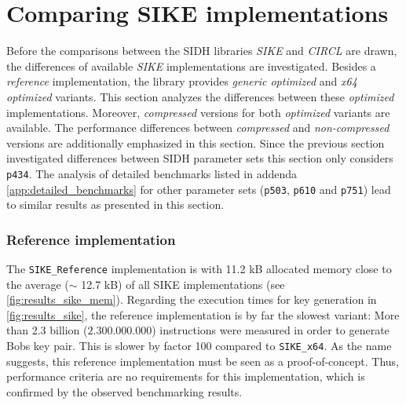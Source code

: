\section{Comparing \gls{SIKE} implementations}\label{sec:analysis_sike}
Before the comparisons between the \gls{SIDH} libraries \textit{\gls{SIKE}} and \textit{\gls{CIRCL}} are drawn, the differences of available \textit{\gls{SIKE}} implementations are investigated. Besides a \textit{reference} implementation, the library provides \textit{generic optimized} and \textit{x64 optimized} variants. This section analyzes the differences between these \textit{optimized} implementations. Moreover,  \textit{compressed} versions for both \textit{optimized} variants are available. The performance differences between \textit{compressed} and \textit{non-compressed} versions are additionally emphasized in this section. Since the previous section investigated differences between \gls{SIDH} parameter sets this section only considers \texttt{p434}. The analysis of detailed benchmarks listed in addenda \ref{app:detailed_benchmarks} for other parameter sets (\texttt{p503}, \texttt{p610} and \texttt{p751}) lead to similar results as presented in this section.


\subsubsection{Reference implementation}
The \texttt{SIKE\_Reference} implementation is with 11.2 \gls{kB} allocated memory close to the average ($\sim$ 12.7 \gls{kB}) of all \gls{SIKE} implementations (see \autoref{fig:results_sike_mem}). Regarding the execution times for key generation in \autoref{fig:results_sike}, the reference implementation is by far the slowest variant: More than 2.3 billion ($2.300.000.000$) instructions were measured in order to generate Bobs key pair. This is slower by factor 100 compared to \texttt{SIKE\_x64}. As the name suggests, this reference implementation must be seen as a proof-of-concept. Thus, performance criteria are no requirements for this implementation, which is confirmed by the observed benchmarking results.

